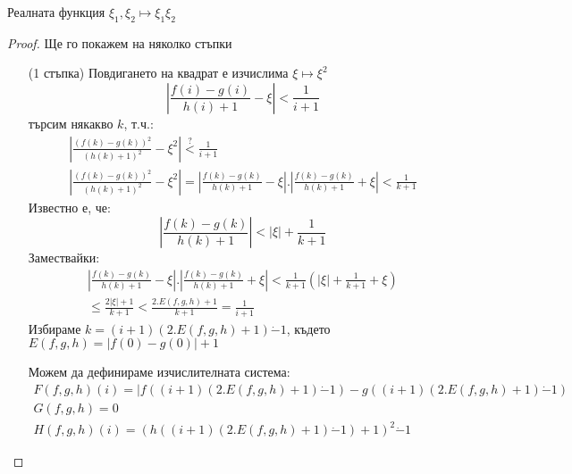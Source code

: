 \begin{theorem}[Умножение]
    Реалната функция $\xi_1, \xi_2 \mapsto \xi_1\xi_2$
\end{theorem}
\begin{proof}
    Ще го покажем на няколко стъпки
    \begin{itemize}
        \item[(1 стъпка)] Повдигането на квадрат е изчислима $\xi \mapsto \xi^2$
        \begin{equation}
            \left|\frac{f(i) - g(i)}{h(i) + 1} - \xi\right| < \frac{1}{i+1}
        \end{equation}
        търсим някакво $k$, т.ч.:
        \begin{equation}
            \begin{split}
                \left|\frac{(f(k) - g(k))^2}{(h(k) + 1)^2} - \xi^2\right| \overset{?}{<} \frac{1}{i+1} \\
                \left|\frac{(f(k) - g(k))^2}{(h(k) + 1)^2} - \xi^2\right| = \left|\frac{f(k) - g(k)}{h(k) + 1} - \xi\right| . \left|\frac{f(k) - g(k)}{h(k) + 1} + \xi\right| < \frac{1}{k+1}
            \end{split}
        \end{equation}
        Известно е, че:
        \begin{equation}
            \left|\frac{f(k) - g(k)}{h(k) + 1} \right| < |\xi| + \frac{1}{k+1}
        \end{equation}
        Замествайки:
        \begin{equation}
            \begin{split}
                \left|\frac{f(k) - g(k)}{h(k) + 1} - \xi\right| . \left|\frac{f(k) - g(k)}{h(k) + 1} + \xi\right| < \frac{1}{k+1}\left(|\xi| + \frac{1}{k+1} + \xi\right) \\
                \leq \frac{2|\xi| + 1}{k+1} < \frac{2.E(f,g,h) + 1}{k+1} = \frac{1}{i+1}
            \end{split}
        \end{equation}
        Избираме $k = (i+1)(2.E(f,g,h) + 1) \dot{-} 1$, където $E(f,g,h) = |f(0) - g(0)| + 1$

        Можем да дефинираме изчислителната система:
        \begin{equation}
            \begin{split}
                F(f,g,h)(i) = |f\left( (i+1)(2.E(f,g,h) + 1) \dot - 1 \right) - g\left((i+1)(2.E(f,g,h) + 1) \dot - 1\right) \\
                G(f,g,h) = 0 \\
                H(f,g,h)(i) = (h((i+1)(2.E(f,g,h) + 1) \dot - 1) + 1)^2 \dot - 1
            \end{split}
        \end{equation}
        

\end{itemize}
\end{proof}
